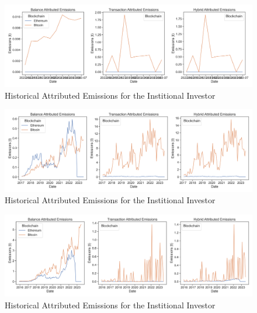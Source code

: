 \documentclass[11pt]{report}
\begin{document}
\begin{figure}[h!]
    \centering
    \centerline{\includegraphics[scale=0.4]{figures/attributed_em_occasionaluser(2022).png}}
    \caption{Historical Attributed Emissions for the Institional Investor}
    \label{fig:attributed_investor}
\end{figure}
\begin{figure}[h!]
    \centering
    \centerline{\includegraphics[scale=0.4]{figures/attributed_em_retailpaymentuser.png}}
    \caption{Historical Attributed Emissions for the Institional Investor}
    \label{fig:attributed_investor}
\end{figure}
\begin{figure}[h!]
    \centering
    \centerline{\includegraphics[scale=0.4]{figures/attributed_em_thehodler.png}}
    \caption{Historical Attributed Emissions for the Institional Investor}
    \label{fig:attributed_investor}
\end{figure}
\end{document}
